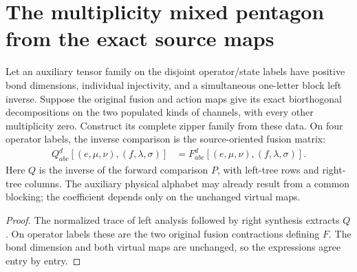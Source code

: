 \section{The multiplicity mixed pentagon from the exact source maps}
\label{sec:glm_source_mixed_pentagon}

\begin{lemma}
    \leanok
    \label{thm:glm_auxiliary_fusion_comparison}
    Let an auxiliary tensor family on the disjoint operator/state labels
    have positive bond dimensions, individual injectivity, and a simultaneous
    one-letter block left inverse. Suppose the original fusion and action
    maps give its exact biorthogonal decompositions on the two populated
    kinds of channels, with every other multiplicity zero. Construct its
    complete zipper family from these data. On four operator labels, the
    inverse comparison is the source-oriented fusion matrix:
    \begin{align}
        Q_{abc}^{d}[(e,\mu,\nu),(f,\lambda,\sigma)]
         & =F_{abc}^{d}[(e,\mu,\nu),(f,\lambda,\sigma)].
        \label{eq:glm_auxiliary_fusion_comparison}
    \end{align}
    Here $Q$ is the inverse of the forward comparison $P$, with left-tree
    rows and right-tree columns. The auxiliary physical alphabet may
    already result from a common blocking; the coefficient depends only
    on the unchanged virtual maps.
\end{lemma}
\begin{proof}
    \leanok
    The normalized trace of left analysis followed by right synthesis
    extracts $Q$. On operator labels these are the two original
    fusion contractions defining $F$. The bond dimension and both virtual
    maps are unchanged, so the expressions agree entry by entry.
\end{proof}

